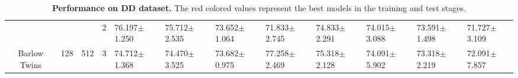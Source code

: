 \begin{table}[htpb]
{\begin{tabular}{c|c|c|c|ll|ll|ll|ll}
                                 &                                                                                 &                                                                                        & 2                                                                                         & 76.197$\pm$1.250                        & 75.712$\pm$2.535                        & 73.652$\pm$1.064                        & 71.833$\pm$2.745                        & 74.833$\pm$2.291                        & 74.015$\pm$3.088                        & 73.591$\pm$1.498                        & 71.727$\pm$3.109                       \\
\multirow{-12}{*}{Barlow Twins}  & \multirow{-6}{*}{128}                                                           & \multirow{-3}{*}{512}                                                                  & 3                                                                                         & 74.712$\pm$1.368                        & 74.470$\pm$3.525                        & 73.682$\pm$0.975                        & 77.258$\pm$2.469                        & 75.318$\pm$2.128                        & 74.091$\pm$5.902                        & 73.318$\pm$2.219                        & 72.091$\pm$7.857                       \\ \hline
\end{tabular}
}
    \caption[Performance on DD dataset]{\textbf{Performance on DD dataset.} The red colored values represent the best models in the training and test stages.}
    \label{tab:dd}
\end{table}


